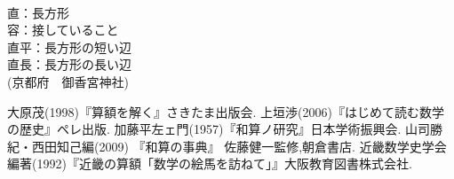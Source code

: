 \documentclass[./main]{subfiles}
\begin{document}
\begin{flushleft}
[用語] \\
直：長方形 \\
容：接していること \\
直平：長方形の短い辺 \\
直長：長方形の長い辺 \\
(京都府　御香宮神社)
\end{flushleft}

\begin{thebibliography}{9}
 大原茂(1998)『算額を解く』さきたま出版会.
 上垣渉(2006)『はじめて読む数学の歴史』ペレ出版.
 加藤平左ェ門(1957)『和算ノ研究』日本学術振興会.
 山司勝紀・西田知己編(2009) 『和算の事典』 佐藤健一監修,朝倉書店.
 近畿数学史学会編著(1992)『近畿の算額「数学の絵馬を訪ねて」』大阪教育図書株式会社.
\end{thebibliography}
\end{document}
